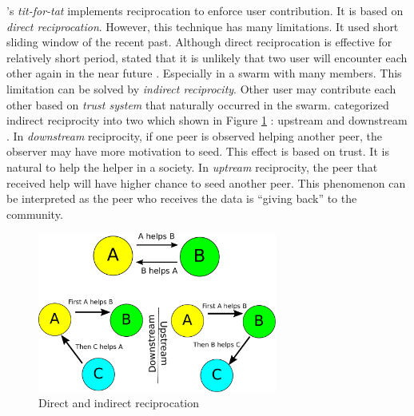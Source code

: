 \bt's \textit{tit-for-tat} implements reciprocation to enforce user contribution. It is based on \textit{direct reciprocation}. However, this technique has many limitations. It used short sliding window of the recent past. Although direct reciprocation is effective for relatively short period, \citeauthor{2011:managesupplydemand:meulpolder} stated that it is unlikely that two user will encounter each other again in the near future \cite{2011:managesupplydemand:meulpolder}. Especially in a swarm with many members. This limitation can be solved by \textit{indirect reciprocity}. Other user may contribute each other based on \textit{trust system} that naturally occurred in the swarm. \citeauthor{2005:indirectreciprocity:nowak} categorized indirect reciprocity into two which shown in Figure \ref{fig:reciprocation} : upstream and downstream \cite{2005:indirectreciprocity:nowak}. In \textit{downstream} reciprocity, if one peer is observed helping another peer, the observer may have more motivation to seed. This effect is based on trust. It is natural to help the helper in a society. In \textit{uptream} reciprocity, the peer that received help will have higher chance to seed another peer. This phenomenon can be interpreted as the peer who receives the data is ``giving back'' to the community.
\begin{figure}[ht]
	\centering
	\includegraphics[width=0.7\textwidth]{pics/reciprocation.pdf}
	\caption{Direct and indirect reciprocation}
	\label{fig:reciprocation}
\end{figure}

